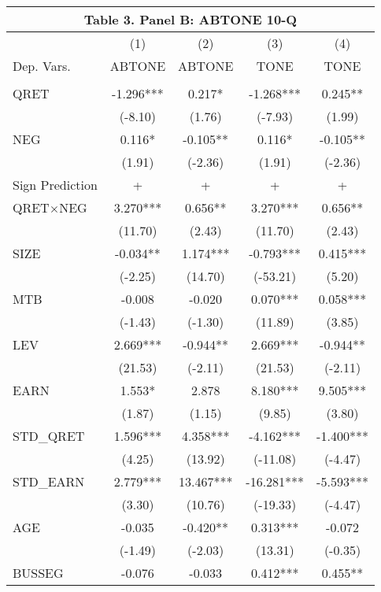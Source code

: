 \begin{table}[htbp] \label{T3PB}
  \centering
    \begin{tabular}{lcccc}
    \multicolumn{5}{c}{\textbf{Table 3. Panel B: ABTONE 10-Q}} \\
    \midrule
      & (1) & (2) & (3) & (4) \\
    Dep. Vars. & ABTONE & ABTONE & TONE & TONE \\
    \midrule
      &   &   &   &  \\
    QRET & -1.296*** & 0.217* & -1.268*** & 0.245** \\
      & (-8.10) & (1.76) & (-7.93) & (1.99) \\
    NEG & 0.116* & -0.105** & 0.116* & -0.105** \\
      & (1.91) & (-2.36) & (1.91) & (-2.36) \\
    \rowcolor[rgb]{ .933,  .925,  .882} Sign Prediction & + & + & + & + \\
    \rowcolor[rgb]{ .933,  .925,  .882} QRET$\times$NEG & 3.270*** & 0.656** & 3.270*** & 0.656** \\
    \rowcolor[rgb]{ .933,  .925,  .882}   & (11.70) & (2.43) & (11.70) & (2.43) \\
    SIZE & -0.034** & 1.174*** & -0.793*** & 0.415*** \\
      & (-2.25) & (14.70) & (-53.21) & (5.20) \\
    MTB & -0.008 & -0.020 & 0.070*** & 0.058*** \\
      & (-1.43) & (-1.30) & (11.89) & (3.85) \\
    LEV & 2.669*** & -0.944** & 2.669*** & -0.944** \\
      & (21.53) & (-2.11) & (21.53) & (-2.11) \\
    EARN & 1.553* & 2.878 & 8.180*** & 9.505*** \\
      & (1.87) & (1.15) & (9.85) & (3.80) \\
    STD\_QRET & 1.596*** & 4.358*** & -4.162*** & -1.400*** \\
      & (4.25) & (13.92) & (-11.08) & (-4.47) \\
    STD\_EARN & 2.779*** & 13.467*** & -16.281*** & -5.593*** \\
      & (3.30) & (10.76) & (-19.33) & (-4.47) \\
    AGE & -0.035 & -0.420** & 0.313*** & -0.072 \\
      & (-1.49) & (-2.03) & (13.31) & (-0.35) \\
    BUSSEG & -0.076 & -0.033 & 0.412*** & 0.455** \\

\end{tabular}
\end{table}
